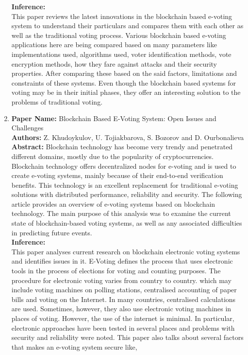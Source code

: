 \documentclass[oneside, 12pt]{book}
\begin{document}
\begin{enumerate}
	      \newpage
	      \textbf{Inference:}
	      \\This paper reviews the latest innovations in the  blockchain based e-voting system to understand their particulars and compares them with each other as well as the traditional voting process. Various blockchain based e-voting applications here are being compared based on many parameters like  implementations used, algorithms used, voter identification methods, vote encryption methods, how they fare against attacks and their security properties. After comparing these based on the said factors, limitations and constraints of these systems. Even though the blockchain based systems for voting may be in their initial phases, they offer an interesting solution to the problems of traditional voting.
	\item
	      \textbf{Paper Name:} Blockchain Based E-Voting System: Open Issues and Challenges \cite{khudoykulov2021blockchain}\\
	      \textbf{Authors:} Z. Khudoykulov, U. Tojiakbarova, S. Bozorov and D. Ourbonalieva\\
	      \textbf{Abstract:} Blockchain technology has become very trendy and penetrated different domains, mostly due to the popularity of cryptocurrencies. Blockchain technology offers decentralized nodes for e-voting and is used to create e-voting systems, mainly because of their end-to-end verification benefits. This technology is an excellent replacement for traditional e-voting solutions with distributed performance, reliability and security. The following article provides an overview of e-voting systems based on blockchain technology. The main purpose of this analysis was to examine the current state of blockchain-based voting systems, as well as any associated difficulties in predicting future events.\\
	      \textbf{Inference:}
	      \\This paper analyses current research on blockchain electronic voting systems and identifies issues in it. E-Voting defines the process that uses electronic tools in the process of elections for voting and counting purposes. The procedure for electronic voting varies from country to country. which may include voting machines on polling stations, centralised accounting of paper bills and voting on the Internet. In many countries, centralised calculations are used. Sometimes, however, they also use electronic voting machines in places of voting. However, the use of the internet is minimal. In particular, electronic approaches have been tested in several places and problems with security and reliability were noted. This paper also talks about several factors that makes an e-voting system secure like,

\end{enumerate}
\end{document}
